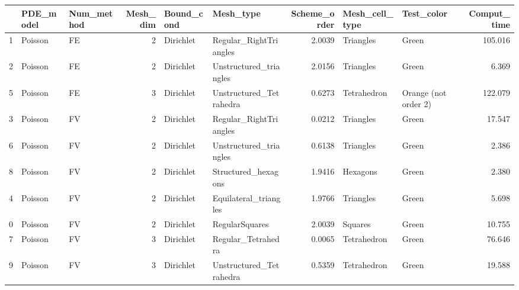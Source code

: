 \begin{tabular}{lllrllrllr}
\toprule
{} & PDE\_model & Num\_method &  Mesh\_dim & Bound\_cond &                Mesh\_type &  Scheme\_order & Mesh\_cell\_type &            Test\_color &  Comput\_time \\
\midrule
1 &   Poisson &         FE &         2 &  Dirichlet &   Regular\_RightTriangles &        2.0039 &      Triangles &                 Green &      105.016 \\
2 &   Poisson &         FE &         2 &  Dirichlet &   Unstructured\_triangles &        2.0156 &      Triangles &                 Green &        6.369 \\
5 &   Poisson &         FE &         3 &  Dirichlet &  Unstructured\_Tetrahedra &        0.6273 &    Tetrahedron &  Orange (not order 2) &      122.079 \\
3 &   Poisson &         FV &         2 &  Dirichlet &   Regular\_RightTriangles &        0.0212 &      Triangles &                 Green &       17.547 \\
6 &   Poisson &         FV &         2 &  Dirichlet &   Unstructured\_triangles &        0.6138 &      Triangles &                 Green &        2.386 \\
8 &   Poisson &         FV &         2 &  Dirichlet &      Structured\_hexagons &        1.9416 &       Hexagons &                 Green &        2.380 \\
4 &   Poisson &         FV &         2 &  Dirichlet &    Equilateral\_triangles &        1.9766 &      Triangles &                 Green &        5.698 \\
0 &   Poisson &         FV &         2 &  Dirichlet &           RegularSquares &        2.0039 &        Squares &                 Green &       10.755 \\
7 &   Poisson &         FV &         3 &  Dirichlet &       Regular\_Tetrahedra &        0.0065 &    Tetrahedron &                 Green &       76.646 \\
9 &   Poisson &         FV &         3 &  Dirichlet &  Unstructured\_Tetrahedra &        0.5359 &    Tetrahedron &                 Green &       19.588 \\
\bottomrule
\end{tabular}

